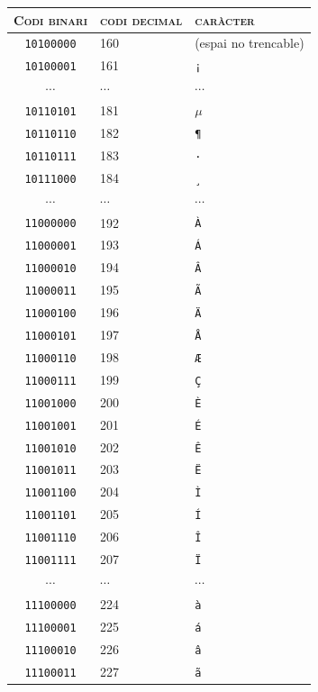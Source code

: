\begin{table}
\begin{center}
\begin{tabular}{c|l|l}
\hline\hline \textsc{Codi binari} & \textsc{codi decimal} &
\textsc{caràcter} \\
\hline
\texttt{10100000} & 160 & (espai no trencable)  \\
\texttt{10100001} & 161 & \texttt{¡} \\
$\cdots$          & $\cdots$ & $\cdots$ \\
\texttt{10110101} & 181 & $\mathtt{\mu}$ \\
\texttt{10110110} & 182 & \texttt{¶} \\
\texttt{10110111} & 183 & \texttt{·} \\
\texttt{10111000} & 184 & \texttt{¸} \\
$\cdots$          & $\cdots$ & $\cdots$ \\
\texttt{11000000} & 192 & \texttt{À} \\
\texttt{11000001} & 193 & \texttt{Á} \\
\texttt{11000010} & 194 & \texttt{Â} \\
\texttt{11000011} & 195 & \texttt{Ã} \\
\texttt{11000100} & 196 & \texttt{Ä} \\
\texttt{11000101} & 197 & \texttt{Å} \\
\texttt{11000110} & 198 & \texttt{Æ} \\
\texttt{11000111} & 199 & \texttt{Ç} \\
\texttt{11001000} & 200 & \texttt{È} \\
\texttt{11001001} & 201 & \texttt{É} \\
\texttt{11001010} & 202 & \texttt{Ê} \\
\texttt{11001011} & 203 & \texttt{Ë} \\
\texttt{11001100} & 204 & \texttt{Ì} \\
\texttt{11001101} & 205 & \texttt{Í} \\
\texttt{11001110} & 206 & \texttt{Î} \\
\texttt{11001111} & 207 & \texttt{Ï} \\
$\cdots$          & $\cdots$ & $\cdots$ \\
\texttt{11100000} & 224 & \texttt{à} \\
\texttt{11100001} & 225 & \texttt{á} \\
\texttt{11100010} & 226 & \texttt{â} \\
\texttt{11100011} & 227 & \texttt{ã} \\

\end{tabular}
\end{center}
\end{table}
